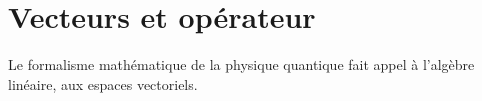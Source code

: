 \chapter{Vecteurs et opérateur}
%
Le formalisme mathématique de la physique quantique fait appel à l'algèbre linéaire, aux espaces vectoriels.
%

%

%

